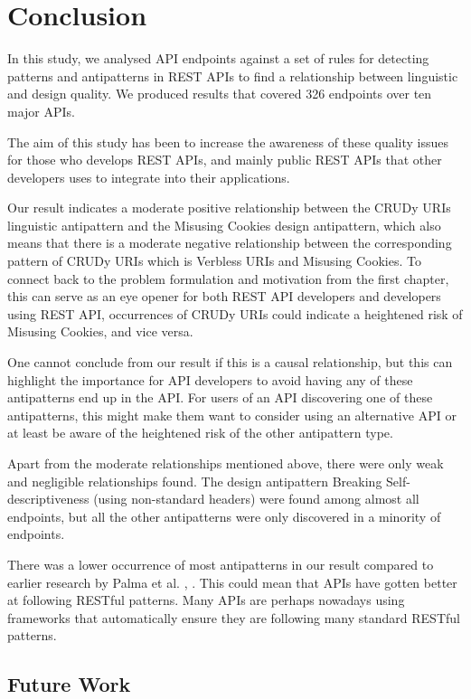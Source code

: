 \section{Conclusion}

In this study, we analysed API endpoints against a set of rules for detecting patterns and antipatterns in REST APIs to find a relationship between linguistic and design quality. We produced results that covered 326 endpoints over ten major APIs. 

The aim of this study has been to increase the awareness of these quality issues for those who develops REST APIs, and mainly public REST APIs that other developers uses to integrate into their applications. 

Our result indicates a moderate positive relationship between the  CRUDy URIs linguistic antipattern and the  Misusing Cookies design antipattern, which also means that there is a moderate negative relationship between the corresponding pattern of CRUDy URIs which is Verbless URIs and Misusing Cookies. To connect back to the problem formulation and motivation from the first chapter, this can serve as an eye opener for both REST API developers and developers using REST API, occurrences of CRUDy URIs could indicate a heightened risk of Misusing Cookies, and vice versa. 

One cannot conclude from our result if this is a causal relationship, but this can highlight the importance for API developers to avoid having any of these antipatterns end up in the API. For users of an API discovering one of these antipatterns, this might make them want to consider using an alternative API or at least be aware of the heightened risk of the other antipattern type. 

Apart from the moderate relationships mentioned above, there were only weak and negligible relationships found. The design antipattern Breaking Self-descriptiveness (using non-standard headers) were found among almost all endpoints, but all the other antipatterns were only discovered in a minority of endpoints. 

There was a lower occurrence of most antipatterns in our result compared to earlier research by Palma et al. \cite{design}, \cite{linguistic}. This could mean that APIs have gotten better at following RESTful patterns. Many APIs are perhaps nowadays using frameworks that automatically ensure they are following many standard RESTful patterns.

\subsection{Future Work}

